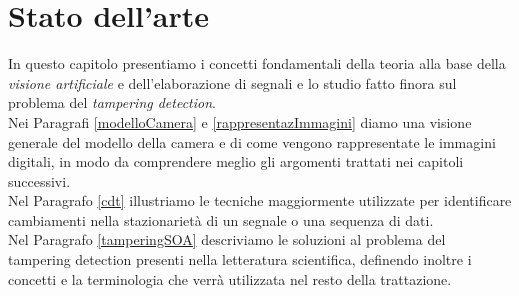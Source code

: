 \chapter{Stato dell'arte}
\label{StatoArte}
\thispagestyle{empty}


\noindent In questo capitolo presentiamo i concetti fondamentali della teoria alla base della \textit{visione artificiale} e dell'elaborazione di segnali e lo studio fatto finora sul problema del \textit{tampering detection}.\\
Nei Paragrafi \ref{modelloCamera} e \ref{rappresentazImmagini} diamo una visione generale del modello della camera e di come vengono rappresentate le immagini digitali, in modo da comprendere meglio gli argomenti trattati nei capitoli successivi.\\
Nel Paragrafo \ref{cdt} illustriamo le tecniche maggiormente utilizzate per identificare cambiamenti nella stazionariet\`a di un segnale o una sequenza di dati.\\
Nel Paragrafo \ref{tamperingSOA} descriviamo le soluzioni al problema del tampering detection presenti nella letteratura scientifica, definendo inoltre i concetti e la terminologia che verr\`a utilizzata nel resto della trattazione.
